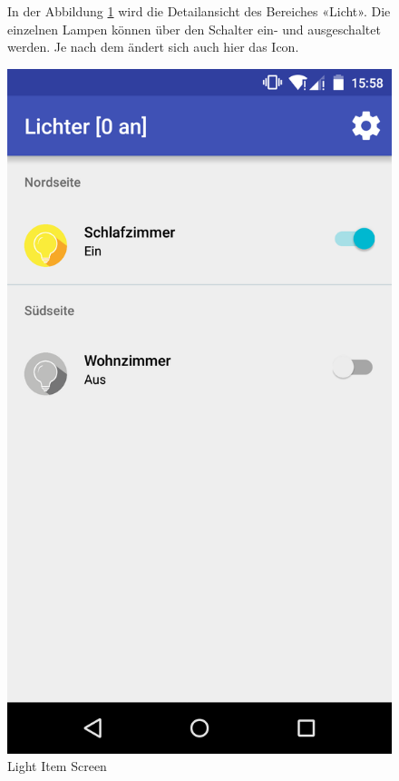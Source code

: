 \begin{figure}[htbp]
	\begin{minipage}{0.6\textwidth} 
In der Abbildung \ref{fig:screenshot_4} wird die Detailansicht des Bereiches «Licht». Die einzelnen Lampen können über den Schalter ein- und ausgeschaltet werden. Je nach dem ändert sich auch hier das Icon.
	\end{minipage}
	\hfill
	\begin{minipage}{0.32\textwidth}
		\includegraphics[scale=0.12]{appendix/img/AppScreenshots/Screenshot4}
		\caption{Light Item Screen}
		\label{fig:screenshot_4}
	\end{minipage}
\end{figure}

